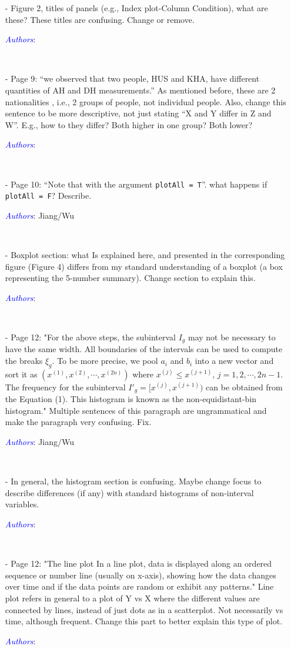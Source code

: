 \documentclass[11pt]{article}
\newcommand{\authors}[1]{

 \parbox{15cm}{\textcolor{blue}{\it Authors}: \color{red}#1}
 \\ \vspace{0.3cm}
}
\begin{document}
\begin{itemize}
{}

\item[-] Figure 2, titles of panels (e.g., Index plot-Column Condition), what are these? These titles are confusing. Change or remove. 
\authors{

}


\item[-] Page 9: “we observed that two people, HUS and KHA, have different quantities of AH and DH measurements.” As mentioned before, these are 2 nationalities , i.e., 2 groups of people, not individual people. Also, change this sentence to be more descriptive, not just stating “X and Y differ in Z and W”. E.g., how to they differ? Both higher in one group? Both lower? 
\authors{

}


\item[-] Page 10: “Note that with the argument {\tt plotAll = T}”. what happens if {\tt plotAll = F}? Describe. 
\authors{Jiang/Wu

}

\item[-] Boxplot section: what Is explained here, and presented in the corresponding figure (Figure 4) differs from my standard understanding of a boxplot (a box representing the 5-number summary). Change section to explain this. 
\authors{

}


\item[-] Page 12: "For the above steps, the subinterval $I_g$ may not be necessary to have the same width. All boundaries of the intervals can be used to compute the breaks $\xi_{g}$. To be more precise, we pool $a_i$ and $b_i$ into a new vector and sort it as $(x^{(1)}, x^{(2)}, \cdots, x^{(2n)})$ where $x^{(j)} \leq x^{(j+1)}$, $j = 1, 2, \cdots, 2n-1$. The frequency for the subinterval $I'_g = [x^{(j)}, x^{(j+1)})$ can be obtained from the Equation (1). This histogram is known as the non-equidistant-bin histogram." Multiple sentences of this paragraph are ungrammatical and make the paragraph very confusing. Fix. 
\authors{Jiang/Wu

}


\item[-] In general, the histogram section is confusing. Maybe change focus to describe differences (if any) with standard histograms of non-interval variables. 
\authors{

}


\item[-] Page 12: "The line plot In a line plot, data is displayed along an ordered sequence or number line (usually on x-axis), showing how the data changes over time and if the data points are random or exhibit any patterns." Line plot refers in general to a plot of Y vs X where the different values are connected by lines, instead of just dots as in a scatterplot. Not necessarily vs time, although frequent. Change this part to better explain this type of plot. 
\authors{

}
\end{itemize}
\end{document}
